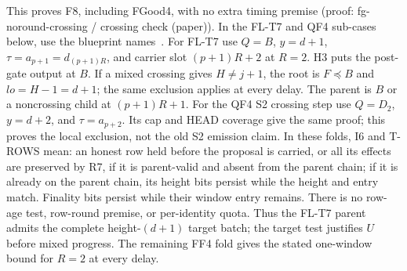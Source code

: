 \documentclass{article}
\theoremstyle{plain}
\theoremstyle{definition}
\theoremstyle{remark}
\begin{document}
This proves F8, including FGood4, with no extra timing premise
(proof: fg-noround-crossing / crossing check (paper)).  In the FL-T7 and QF4 sub-cases below, use the blueprint
names~\cite[FL-T7, QF4 S2]{BPF}.  For FL-T7 use
$Q=B$, $y=d+1$, $\tau=a_{p+1}=d_{(p+1)R}$, and carrier slot
$(p+1)R+2$ at $R=2$.  H3 puts the post-gate output at $B$.
If a mixed crossing gives $H\neq j+1$, the root is $F\preceq B$
and $\mathit{lo}=H-1=d+1$; the same exclusion applies at every delay.
The parent is $B$ or a noncrossing child at $(p+1)R+1$.
For the QF4 S2 crossing step use $Q=D_2$, $y=d+2$, and
$\tau=a_{p+2}$.  Its cap and HEAD coverage give the same proof;
this proves the local exclusion, not the old S2 emission claim.
In these folds, I6 and T-ROWS mean: an honest row held before the
proposal is carried, or all its effects are preserved by R7, if it is
parent-valid and absent from the parent chain; if it is already on the
parent chain, its height bits persist while the height and entry match.
Finality bits persist while their window entry remains.
There is no row-age test, row-round premise, or per-identity quota.
Thus the FL-T7 parent admits the complete height-$(d+1)$ target batch;
the target test justifies $U$ before mixed progress.  The remaining FF4
fold gives the stated one-window bound for $R=2$ at every delay.
\end{document}
